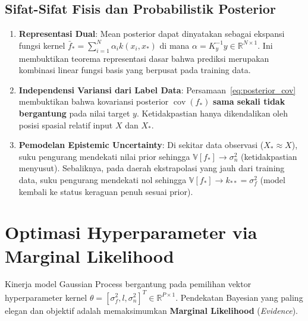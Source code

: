 \documentclass[11pt,a4paper]{article}
\def\boldsymbol#1{#1}%
\def\mathbf#1{#1}%
\begin{document}
\subsection{Sifat-Sifat Fisis dan Probabilistik Posterior}
\begin{enumerate}
    \item \textbf{Representasi Dual}: Mean posterior dapat dinyatakan sebagai ekspansi fungsi kernel $\bar{f}_* = \sum_{i=1}^N \alpha_i k(\mathbf{x}_i, \mathbf{x}_*)$ di mana $\boldsymbol{\alpha} = K_y^{-1}\mathbf{y} \in \mathbb{R}^{N \times 1}$. Ini membuktikan teorema representasi dasar bahwa prediksi merupakan kombinasi linear fungsi basis yang berpusat pada training data.
    \item \textbf{Independensi Variansi dari Label Data}: Persamaan~\eqref{eq:posterior_cov} membuktikan bahwa kovariansi posterior $\operatorname{cov}(\mathbf{f}_*)$ \textbf{sama sekali tidak bergantung} pada nilai target $\mathbf{y}$. Ketidakpastian hanya dikendalikan oleh posisi spasial relatif input $X$ dan $X_*$.
    \item \textbf{Pemodelan Epistemic Uncertainty}: Di sekitar data observasi ($X_* \approx X$), suku pengurang mendekati nilai prior sehingga $\mathbb{V}[f_*] \to \sigma_n^2$ (ketidakpastian menyusut). Sebaliknya, pada daerah ekstrapolasi yang jauh dari training data, suku pengurang mendekati nol sehingga $\mathbb{V}[f_*] \to k_{**} = \sigma_f^2$ (model kembali ke status keraguan penuh sesuai prior).
\end{enumerate}

\section{Optimasi Hyperparameter via Marginal Likelihood}
\label{sec:marginal_likelihood}

Kinerja model Gaussian Process bergantung pada pemilihan vektor hyperparameter kernel $\boldsymbol{\theta} = [\sigma_f^2, l, \sigma_n^2]^T \in \mathbb{R}^{P \times 1}$. Pendekatan Bayesian yang paling elegan dan objektif adalah memaksimumkan \textbf{Marginal Likelihood} (\textit{Evidence}).
\end{document}
